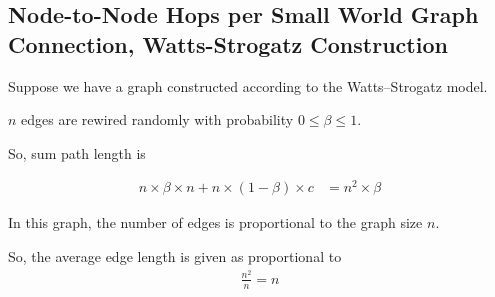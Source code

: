\subsection{Node-to-Node Hops per Small World Graph Connection, Watts-Strogatz Construction}

Suppose we have a graph constructed according to the Watts–Strogatz model.

$n$ edges are rewired randomly with probability $0 \leq \beta \leq 1$.

So, sum path length is

\begin{align*}
n \times \beta \times n + n \times (1 - \beta) \times c
&= n^{2} \times \beta
\end{align*}

In this graph, the number of edges is proportional to the graph size $n$.

So, the average edge length is given as proportional to
\begin{align*}
\frac{n^{2}}{n} = n
\end{align*}
